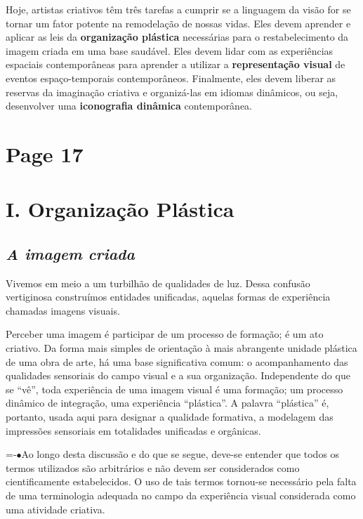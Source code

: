 \documentclass[a4paper]{article}
\begin{document}
Hoje, artistas criativos têm três tarefas a cumprir se a linguagem da visão for se tornar um fator potente na remodelação de nossas vidas. Eles devem aprender e aplicar as leis da \textbf{organização plástica} necessárias para o restabelecimento da imagem criada em uma base saudável. Eles devem lidar com as experiências espaciais contemporâneas para aprender a utilizar a \textbf{representação visual} de eventos espaço-temporais contemporâneos. Finalmente, eles devem liberar as reservas da imaginação criativa e organizá-las em idiomas dinâmicos, ou seja, desenvolver uma \textbf{iconografia dinâmica} contemporânea.

\newpage
\section*{Page 17}

\section*{I. Organização Plástica}

\subsection*{\textit{A imagem criada}}

Vivemos em meio a um turbilhão de qualidades de luz. Dessa confusão vertiginosa construímos entidades unificadas, aquelas formas de experiência chamadas imagens visuais.

Perceber uma imagem é participar de um processo de formação; é um ato criativo. Da forma mais simples de orientação à mais abrangente unidade plástica de uma obra de arte, há uma base significativa comum: o acompanhamento das qualidades sensoriais do campo visual e a sua organização. Independente do que se ``vê'', toda experiência de uma imagem visual é uma formação; um processo dinâmico de integração, uma experiência ``plástica''. A palavra ``plástica'' é, portanto, usada aqui para designar a qualidade formativa, a modelagem das impressões sensoriais em totalidades unificadas e orgânicas.

\par\vspace{\baselineskip}%
{\small%
\noindent\hangindent=\parindent{}\kern-\parindent$\bullet$\enspace Ao longo desta discussão e do que se segue, deve-se entender que todos os termos utilizados são arbitrários e não devem ser considerados como cientificamente estabelecidos. O uso de tais termos tornou-se necessário pela falta de uma terminologia adequada no campo da experiência visual considerada como uma atividade criativa.%
}%
\normalsize%
\end{document}
